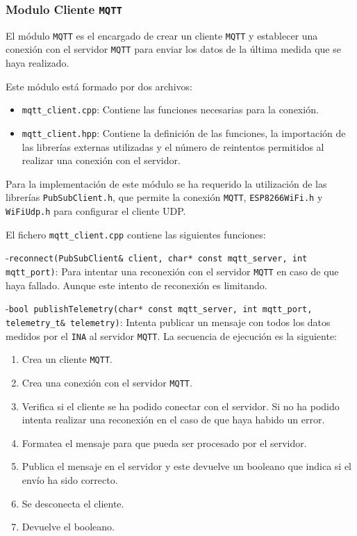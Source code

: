 \subsubsection{Modulo Cliente \texttt{MQTT}}

El módulo \texttt{MQTT} es el encargado de crear un cliente \texttt{MQTT} y establecer una conexión con el servidor \texttt{MQTT} para enviar los datos de la última medida que se haya realizado. 

Este módulo está formado por dos archivos:
\begin{itemize}
    \item \texttt{mqtt\_client.cpp}: Contiene las funciones necesarias para la conexión.
    \item \texttt{mqtt\_client.hpp}: Contiene la definición de las funciones, la importación de las librerías externas utilizadas y el número de reintentos permitidos al realizar una conexión con el servidor.
\end{itemize}

Para la implementación de este módulo se ha requerido la utilización de las librerías \texttt{PubSubClient.h}, que permite la conexión \texttt{MQTT}, \texttt{ESP8266WiFi.h} y \texttt{WiFiUdp.h} para configurar el cliente UDP.\cite{olearyKnollearyPubsubclient2024}

El fichero \texttt{mqtt\_client.cpp} contiene las siguientes funciones:

-\texttt{reconnect(PubSubClient\& client, char* const mqtt\_server, int mqtt\_port)}: Para intentar una reconexión con el servidor \texttt{MQTT} en caso de que haya fallado. Aunque este intento de reconexión es limitando.

-\texttt{bool publishTelemetry(char* const mqtt\_server, int mqtt\_port,}\texttt{ telemetry\_t\& telemetry)}: Intenta publicar un mensaje con todos los datos medidos por el \texttt{INA} al servidor \texttt{MQTT}.  La secuencia de ejecución es la siguiente:
\begin{enumerate}
    \item Crea un cliente \texttt{MQTT}.
    \item Crea una conexión con el servidor \texttt{MQTT}.
    \item Verifica si el cliente se ha podido conectar con el servidor. Si no ha podido intenta realizar una reconexión en el caso de que haya habido un error.
    \item Formatea el mensaje para que pueda ser procesado por el servidor.
    \item Publica el mensaje en el servidor y este devuelve un booleano que indica si el envío ha sido correcto.
    \item Se desconecta el cliente.
    \item Devuelve el booleano.
\end{enumerate}

